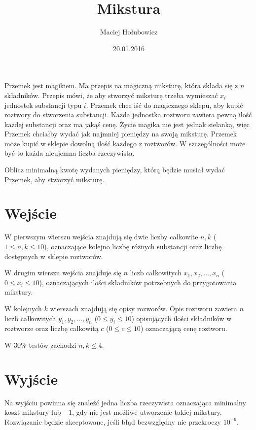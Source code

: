 \documentclass[zad,zawodnik,utf8]{sinol}
\title{Mikstura}
\author{Maciej Hołubowicz} %
\date{20.01.2016}
\begin{document}
\begin{tasktext}%
Przemek jest magikiem. Ma przepis na magiczną miksturę, która składa się z $n$ składników.
Przepis mówi, że aby stworzyć miksturę trzeba wymieszać $x_i$ jednostek substancji typu $i$.
Przemek chce iść do magicznego sklepu, aby kupić roztwory do stworzenia substancji.
Każda jednostka roztworu zawiera pewną ilość każdej substancji oraz ma jakąś cenę.
Życie magika nie jest jednak sielanką, więc Przemek chciałby wydać jak najmniej pieniędzy na swoją miksturę.
Przemek może kupić w sklepie dowolną ilość każdego z roztworów. W szczególności może być to każda nieujemna liczba rzeczywista.

Oblicz minimalną kwotę wydanych pieniędzy, którą będzie musiał wydać Przemek, aby stworzyć miksturę.

  \section{Wejście}
W pierwszym wierszu wejścia znajdują się dwie liczby całkowite $n, k$ ($1 \leq n, k\leq 10$), oznaczające kolejno liczbę różnych substancji oraz liczbę dostępnych w sklepie roztworów.

W drugim wierszu wejścia znajduje się $n$ liczb całkowitych $x_1, x_2, ..., x_n$ ($0 \leq x_i \leq 10$), oznaczających ilości składników potrzebnych do przygotowania mikstury.

W kolejnych $k$ wierszach znajdują się opisy rozworów. Opis roztworu zawiera $n$ liczb całkowitych $y_1, y_2, ..., y_n$ ($0 \leq y_i \leq 10$) opisujących ilości składników w roztworze oraz liczbę całkowitą $c$ ($0 \leq c \leq 10$) oznaczającą cenę roztworu.

W $30\%$ testów zachodzi $n, k \leq 4$.

  \section{Wyjście}
Na wyjściu powinna się znaleźć jedna liczba rzeczywista oznaczająca minimalny koszt mikstury lub $-1$, gdy nie jest możliwe utworzenie takiej mikstury.
Rozwiązanie będzie akceptowane, jeśli błąd bezwzględny nie przekroczy $10^{-9}$.

\makecompactexample

\end{tasktext}
\end{document}
